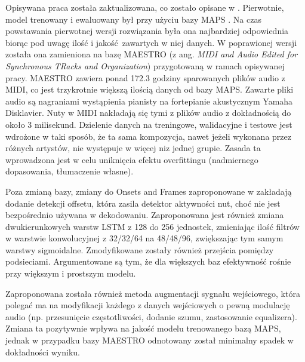 \documentclass[12pt,a4paper,twoside]{mwart}
\begin{document}
Opisywana praca została zaktualizowana, co zostało opisane w \cite[3-6]{Transcription:Cheng:OnsetsAndFramesNovelization}. Pierwotnie, model trenowany i ewaluowany był przy użyciu bazy MAPS \cite{Transcription:OnsetsAndFrames:MAPS}. Na czas powstawania pierwotnej wersji rozwiązania była ona najbardziej odpowiednia biorąc pod uwagę ilość i jakość zawartych w niej danych. W poprawionej wersji została ona zamieniona na bazę MAESTRO (z ang. \textit{MIDI and Audio Edited for Synchronous TRacks and Organization}) przygotowaną w ramach opisywanej pracy. MAESTRO zawiera ponad 172.3 godziny sparowanych plików audio z MIDI, co jest trzykrotnie większą ilością danych od bazy MAPS. Zawarte pliki audio są nagraniami wystąpienia pianisty na fortepianie akustycznym Yamaha Disklavier. Nuty w MIDI nakładają się tymi z plików audio z dokładnością do około 3 milisekund. Dzielenie danych na treningowe, walidacyjne i testowe jest wdrożone w taki sposób, że ta sama kompozycja, nawet jeżeli wykonana przez różnych artystów, nie występuje w więcej niz jednej grupie. Zasada ta wprowadzona jest w celu uniknięcia efektu overfittingu (nadmiernego dopasowania, tłumaczenie własne).%

Poza zmianą bazy, zmiany do Onsets and Frames zaproponowane w \cite[3-6]{Transcription:Cheng:OnsetsAndFramesNovelization} zakładają dodanie detekcji offsetu, która zasila detektor aktywności nut, choć nie jest bezpośrednio używana w dekodowaniu. Zaproponowana jest również zmiana dwukierunkowych warstw LSTM z 128 do 256 jednostek, zmieniając ilość filtrów w warstwie konwolucyjnej z 32/32/64 na 48/48/96, zwiększając tym samym warstwy sigmoidalne. Zmodyfikowane zostały również przejścia pomiędzy podsieciami. Argumentowane są tym, że dla większych baz efektywność rośnie przy większym i prostszym modelu. 

Zaproponowana została również metoda augmentacji sygnału wejściowego, która polegać ma na modyfikacji każdego z danych wejściowych o pewną modulację audio (np. przesunięcie częstotliwości, dodanie szumu, zastosowanie equalizera). Zmiana ta pozytywnie wpływa na jakość modelu trenowanego bazą MAPS, jednak w przypadku bazy MAESTRO odnotowany został minimalny spadek w dokładności wyniku. 

\newpage
\end{document}
